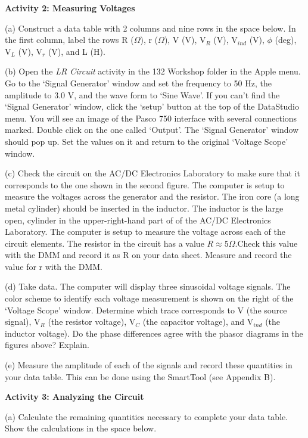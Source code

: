 \textbf{Activity 2: Measuring Voltages} 

(a) Construct a data table with 2 columns and nine rows in the space
below. In the first column, label the rows R (\( \Omega  \)), r (\( \Omega  \)), V (V),
V\( _{R} \) (V), V\( _{ind} \) (V), \( \phi  \) (deg), V\( _{L} \)
(V), V\( _{r} \) (V), and L (H).
\vspace{4in}

(b) Open the \emph{LR Circuit} activity
in the 132 Workshop folder in the Apple menu. 
Go to the `Signal Generator' window and set the frequency to 50 Hz, the amplitude 
to 3.0 V, and the wave form to `Sine Wave'.
If you can't find the `Signal Generator' window, click the `setup' button at
the top of the DataStudio menu.
You will see an image of the Pasco 750 interface with several
connections marked.
Double click on the one called `Output'.
The `Signal Generator' window should pop up. 
Set the values on it and return to the original `Voltage Scope' window.

(c) Check the circuit on the AC/DC Electronics Laboratory
to make sure that it corresponds to the one
shown in the second figure. The computer is setup to measure the voltages
across the generator and the resistor. The iron core (a long metal cylinder)
should be inserted in the inductor.
The inductor is the large open, cylinder in the upper-right-hand part of
of the AC/DC Electronics Laboratory.
The computer is setup to measure the voltage
across each of the circuit elements. The resistor in the circuit 
has a value $R\approx 5\Omega$.Check this value with the DMM and record it
as R on your data sheet. Measure and record the value for r with the DMM.

(d) Take data. The computer will display three sinusoidal
voltage signals. The color scheme to identify each voltage measurement
is shown on the right of the `Voltage Scope' window. Determine which trace
corresponds to V (the source signal), V\( _{R} \) (the resistor voltage),
V\( _{C} \) (the capacitor voltage), and V\( _{ind} \) (the inductor voltage).
 Do the phase differences agree with
the phasor diagrams in the  figures above? Explain.
\vspace{20mm}

(e) Measure the amplitude of each of the signals and record these
quantities in your data table. This can be done using the SmartTool 
(see Appendix B).

\textbf{Activity 3: Analyzing the Circuit}
 
(a) Calculate the remaining quantities necessary to complete your
data table. Show the calculations in the space
below.
\vspace{3in}

